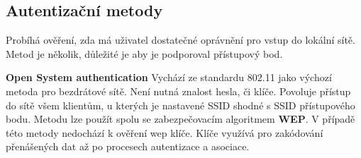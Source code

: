 \subsection{Autentizační metody}
Probíhá ověření, zda má uživatel dostatečné oprávnění pro vstup do lokální sítě. Metod je několik, důležité je aby je podporoval přístupový bod.\par
\textbf{Open System authentication} Vychází ze standardu 802.11 jako výchozí metoda pro bezdrátové sítě. Není nutná znalost hesla, či klíče. Povoluje přístup do sítě všem klientům, u kterých je nastavené SSID shodné s SSID přístupového bodu. Metodu lze použít spolu se zabezpečovacím algoritmem \textbf{WEP}. V případě této metody nedochází k ověření wep klíče. Klíče využívá pro zakódování přenášených dat až po procesech autentizace a asociace.\par

